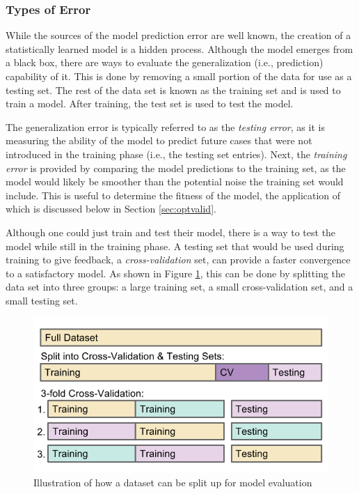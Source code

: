 \subsubsection{Types of Error}

While the sources of the model prediction error are well known, the creation of
a statistically learned model is a hidden process. Although the model emerges
from a black box, there are ways to evaluate the generalization (i.e.,
prediction) capability of it.  This is done by removing a small portion of the
data for use as a testing set.  The rest of the data set is known as the
training set and is used to train a model. After training, the test set is used
to test the model.  

The generalization error is typically referred to as the \textit{testing
error}, as it is measuring the ability of the model to predict future cases
that were not introduced in the training phase (i.e., the testing set entries).
Next, the \textit{training error} is provided by comparing the model
predictions to the training set, as the model would likely be smoother than the
potential noise the training set would include. This is useful to determine the
fitness of the model, the application of which is discussed below in Section
\ref{sec:optvalid}.

Although one could just train and test their model, there is a way to test the
model while still in the training phase. A testing set that would be used
during training to give feedback, a \textit{cross-validation} set, can provide
a faster convergence to a satisfactory model. As shown in Figure
\ref{fig:cverror}, this can be done by splitting the data set into three
groups: a large training set, a small cross-validation set, and a small testing
set. 

\begin{figure}[!htb]
  \includegraphics[width=\linewidth]{./chapters/litrev/cverror.png}
  \caption{Illustration of how a dataset can be split up for model evaluation}
  \label{fig:cverror}
\end{figure}

